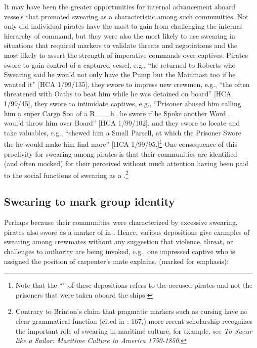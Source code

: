 It may have been the greater opportunities for internal advancement aboard  vessels that promoted swearing as a characteristic  among such communities. Not only did individual pirates have the most to gain from challenging the internal hierarchy of command, but they were also the most likely to use swearing in situations that required  markers to validate threats and negotiations and the most likely to assert the strength of imperative commands over captives. Pirates swore to gain control of a captured vessel, e.g., “he returned to Roberts who Swearing said he wou’d not only have the Pump but the Mainmast too if he wanted it” [HCA 1/99/135], they swore to impress new crewmen, e.g., “the  often threatened with Oaths to beat him while he was detained on board” [HCA 1/99/45], they swore to intimidate captives, e.g., “Prisoner abused him calling him a super Cargo Son of a B\_\_\_h...he swore if he Spoke another Word ... woul’d throw him over Board” [HCA 1/99/102], and they swore to locate and take valuables, e.g., “shewed him a Small Parsell, at which the Prisoner Swore the he would make him find more” [HCA 1/99/95.]\footnote{Note that the “” of these depositions refers to the accused pirates and not the prisoners that were taken aboard the  ships.}  One consequence of this proclivity for swearing among pirates is that their communities are identified (and often mocked) for their perceived  without much attention having been paid to the social functions of swearing as a .\footnote{Contrary to Brinton’s claim that pragmatic markers such as cursing have no clear grammatical function (cited in \citealt{ClaridgeArnovick2010}: 167,) more recent scholarship recognizes the important role of swearing in maritime culture, for example, see  \textit{To Swear like a Sailor: Maritime Culture in America {1750}-1850}.} 

\subsection{{Swearing to mark group identity}}%

Perhaps because their communities were characterized by excessive swearing, pirates also swore as a marker of in-. Hence, various depositions give examples of swearing among crewmates without any suggestion that violence, threat, or challenges to authority are being invoked, e.g., one impressed captive who is assigned the position of carpenter’s mate explains, (marked for emphasis): 

